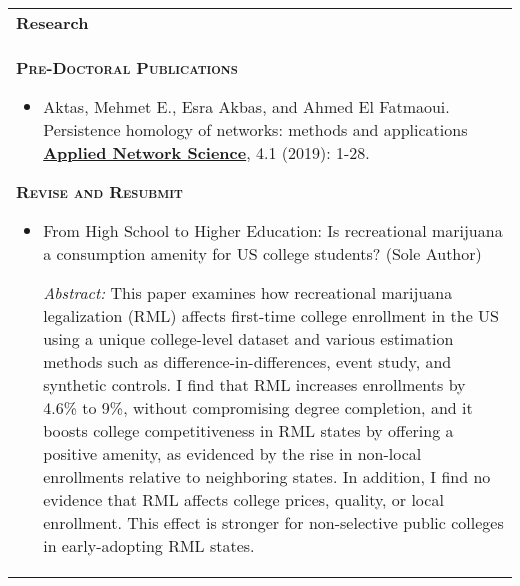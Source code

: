 \documentclass[10pt,letterpaper]{article}
\begin{document}
\begin{tabular}{p{7.5in}} \\
{\textbf{\large{Research}}} \\[1.5ex]


 \textsc{\textbf{Pre-Doctoral Publications}} 

\begin{itemize}
\item Aktas,  Mehmet E., Esra Akbas, and Ahmed El Fatmaoui.  Persistence homology of networks: methods and applications \href{https://appliednetsci.springeropen.com/articles/10.1007/s41109-019-0179-3}{\textbf{Applied Network Science}},  4.1 (2019): 1-28.
\end{itemize}

\textsc{\textbf{Revise and Resubmit}}

\begin{itemize}
\item From High School to Higher Education: Is recreational marijuana a consumption amenity  for US college students? (Sole Author)

\textit{Abstract: } This paper examines how recreational marijuana legalization (RML) affects first-time college enrollment in the US using a unique college-level dataset and various estimation methods such as difference-in-differences, event study, and synthetic controls. I find that RML increases enrollments by 4.6\% to 9\%, without compromising degree completion, and it boosts college competitiveness in RML states by offering a positive amenity, as evidenced by the rise in non-local enrollments relative to neighboring states. In addition, I find no evidence that RML affects college prices, quality, or local enrollment. This effect is stronger for non-selective public colleges in early-adopting RML states.


\end{itemize}
\end{tabular}
\end{document}
